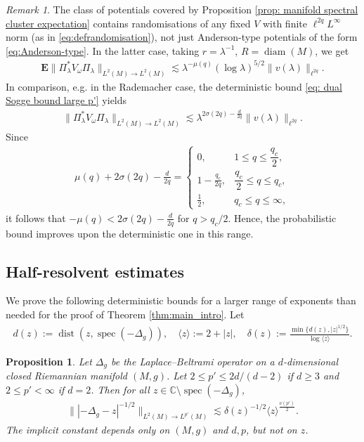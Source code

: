 \documentclass[12pt,reqno]{amsart}
\newtheorem{proposition}[theorem]{Proposition}
\theoremstyle{definition}
\theoremstyle{remark}
\newtheorem{remark}[theorem]{Remark}
\numberwithin{equation}{section}
\newcommand{\1}{\mathbbm{1}}
\newcommand{\C}{\mathbb{C}}
\DeclareMathOperator{\diam}{diam}
\DeclareMathOperator{\dist}{dist}
\DeclareMathOperator{\spec}{spec}
\begin{document}
\begin{remark}\label{rem:rand.of_fixed_V}
    The class of potentials covered by Proposition \ref{prop: manifold spectral cluster expectation} contains randomisations of any fixed $V$ with finite $\ell^{2q}L^{\infty}$ norm (as in \eqref{eq:defrandomisation}), not just Anderson-type potentials of the form \eqref{eq:Anderson-type}. In the latter case, taking $r=\lambda^{-1}$, $R=\diam(M)$, we get
      \begin{align*}
    \mathbf{E}\|\Pi_{\lambda} ^*V_{\omega}\Pi_{\lambda} \|_{L^2(M)\to L^2(M)}
     \lesssim \lambda^{-\mu(q)}(\log \lambda )^{5/2}\|v(\lambda)\|_{\ell^{2q}}.
  \end{align*}    
In comparison, e.g. in the Rademacher case, the deterministic bound \eqref{eq: dual Sogge bound large p'} yields 
\begin{align*}
\|\Pi_{\lambda} ^*V_{\omega}\Pi_{\lambda} \|_{L^2(M)\to L^2(M)}
     \lesssim \lambda^{2\sigma(2q)-\frac{d}{2q}}\|v(\lambda)\|_{\ell^{2q}}.   
\end{align*}
Since
\begin{align}\label{eq:mu(q)+2sigma(2q)-d/2q}
\mu(q)+2\sigma(2q)-\frac{d}{2q}
=
\begin{cases}
0, & 1\le q\le \dfrac{q_c}{2},\\
1-\frac{q_c}{2q}, & \dfrac{q_c}{2}\le q\le q_c,\\
\frac12, & q_c\le q\leq\infty,
\end{cases}
\end{align}
it follows that $-\mu(q)<2\sigma(2q)-\frac{d}{2q}$ for $q>q_c/2$. Hence, the probabilistic bound improves upon the deterministic one in this range.
\end{remark}


\subsection{Half-resolvent estimates}\label{sect:Half-resolvent estimates}
We prove the following deterministic bounds for a larger range of exponents than needed for the proof of Theorem \ref{thm:main_intro}.
Let 
\begin{align}\label{def:delta(z)}
d(z):=\dist(z,\spec(-\Delta_g)),\quad \langle z\rangle:=2+|z|,\quad \delta(z):=\frac{\min\{d(z),|z|^{1/2}\}}{\log\langle z\rangle}.
\end{align}


\begin{proposition}\label{prop:L2_to_Lp'_resolvent_estimate}
  Let $\Delta_g$ be the Laplace--Beltrami operator on a $d$-dimensional closed Riemannian manifold $(M,g)$. Let $2\leq p'\leq 2d/(d-2)$ if $d\geq 3$ and $2\leq p'<\infty$ if $d=2$.
  Then for all $z\in \C\setminus\spec(-\Delta_g)$,
  \begin{align}
    \||-\Delta_g-z|^{-1/2}\|_{L^{2}(M)\to L^{p'}(M)}
    \lesssim \delta(z)^{-1/2} \langle z\rangle^{\frac{\nu(p')}{2}}.\label{eq: deterministic half resolvent bound}
  \end{align}  
  The implicit constant depends only on $(M,g)$ and $d,p$, but not on $z$.
\end{proposition}
\end{document}
